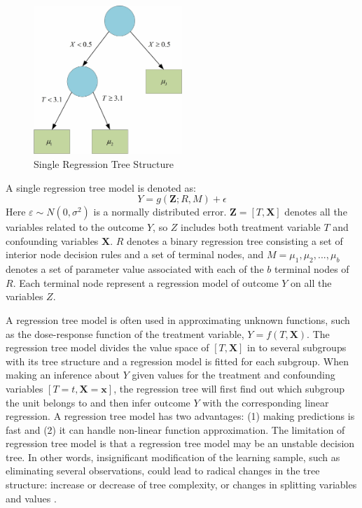 \begin{figure}[!thpb]
\centering
\includegraphics[width=0.5\textwidth]{chapter4_SingleRGT.pdf}
\caption{Single Regression Tree Structure}
\label{singlergt}
\end{figure}

A single regression tree model is denoted as:
\begin{equation*}
Y=g(\pmb{Z}; R, M)+\epsilon
\end{equation*}
Here $\varepsilon  \sim N(0,{\sigma ^2})$ is a normally distributed error. $\pmb{Z}=[T,\pmb{X}]$ denotes all the variables related to the outcome $Y$, so $Z$ includes both treatment variable $T$ and confounding variables $\pmb{X}$. $R$ denotes a binary regression tree consisting a set of interior node decision rules and a set of terminal nodes, and $M=
{
 \mu _1, \mu _2, . . ., \mu _b
}$
denotes a set of parameter value associated with each of the $b$ terminal nodes of $R$. Each terminal node represent a regression model of outcome $Y$ on all the variables $Z$.

A regression tree model is often used in approximating unknown functions, such as the dose-response function of the treatment variable, $Y=f(T,\pmb{X})$. The regression tree model divides the value space of $[T,\pmb{X}]$ in to several subgroups with its tree structure and a regression model is fitted for each subgroup. When making an inference about $Y$ given values for the treatment and confounding variables $[T=t,\pmb{X}=\pmb{x}]$, the regression tree will first find out which subgroup the unit belongs to and then infer outcome $Y$ with the corresponding linear regression. A regression tree model has two advantages: (1) making predictions is fast and (2) it can handle non-linear function approximation.  The limitation of regression tree model is that a regression tree model may be an unstable decision tree. In other words, insignificant modification of the learning sample, such as eliminating several observations, could lead to radical changes in the tree structure: increase or decrease of tree complexity, or changes in splitting variables and values \cite{timofeev2004classification}.


